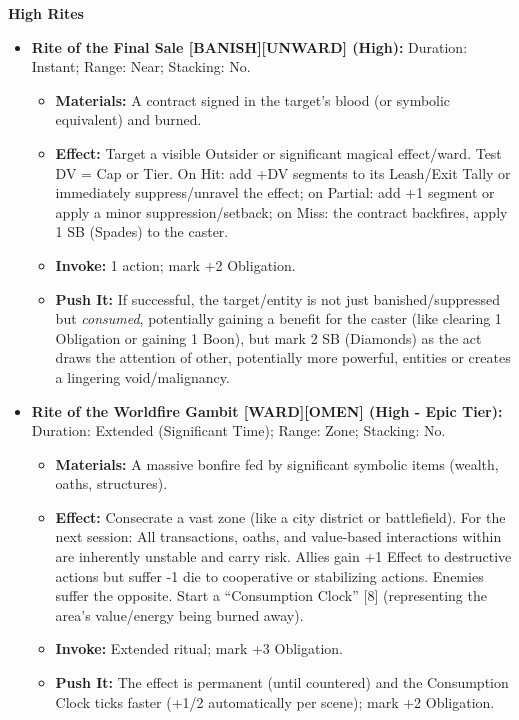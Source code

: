 \documentclass[11pt,letterpaper]{article}
\newcommand{\patronbox}[1]{\noindent\textbf{#1}\\}
\begin{document}
\patronbox{High Rites}
\begin{itemize}[leftmargin=*]
    \item \textbf{Rite of the Final Sale [BANISH][UNWARD] (High):} Duration: Instant; Range: Near; Stacking: No.
    \begin{itemize}
        \item \textbf{Materials:} A contract signed in the target's blood (or symbolic equivalent) and burned.
        \item \textbf{Effect:} Target a visible Outsider or significant magical effect/ward. Test DV = Cap or Tier. On Hit: add +DV segments to its Leash/Exit Tally or immediately suppress/unravel the effect; on Partial: add +1 segment or apply a minor suppression/setback; on Miss: the contract backfires, apply 1 SB (Spades) to the caster.
        \item \textbf{Invoke:} 1 action; mark +2 Obligation.
        \item \textbf{Push It:} If successful, the target/entity is not just banished/suppressed but \textit{consumed}, potentially gaining a benefit for the caster (like clearing 1 Obligation or gaining 1 Boon), but mark 2 SB (Diamonds) as the act draws the attention of other, potentially more powerful, entities or creates a lingering void/malignancy.
    \end{itemize}
    \item \textbf{Rite of the Worldfire Gambit [WARD][OMEN] (High - Epic Tier):} Duration: Extended (Significant Time); Range: Zone; Stacking: No.
    \begin{itemize}
        \item \textbf{Materials:} A massive bonfire fed by significant symbolic items (wealth, oaths, structures).
        \item \textbf{Effect:} Consecrate a vast zone (like a city district or battlefield). For the next session: All transactions, oaths, and value-based interactions within are inherently unstable and carry risk. Allies gain +1 Effect to destructive actions but suffer -1 die to cooperative or stabilizing actions. Enemies suffer the opposite. Start a ``Consumption Clock'' [8] (representing the area's value/energy being burned away).
        \item \textbf{Invoke:} Extended ritual; mark +3 Obligation.
        \item \textbf{Push It:} The effect is permanent (until countered) and the Consumption Clock ticks faster (+1/2 automatically per scene); mark +2 Obligation.
    \end{itemize}
\end{itemize}
\end{document}
